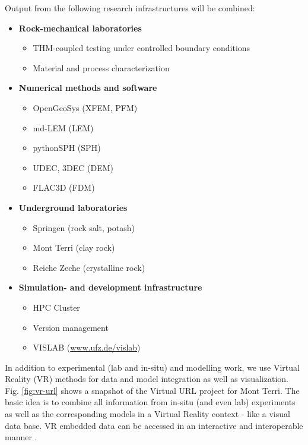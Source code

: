 Output from the following research infrastructures will be combined:
\begin{itemize}
    \item \textbf{Rock-mechanical laboratories}
	\begin{itemize}
		\item THM-coupled testing under controlled boundary conditions
		\item Material and process characterization
	\end{itemize}
	\item \textbf{Numerical methods and software}
	\begin{itemize}
		\item OpenGeoSys (XFEM, PFM)
		\item md-LEM (LEM)
		\item pythonSPH (SPH)
		\item UDEC, 3DEC (DEM)
		\item FLAC3D (FDM)
	\end{itemize}
	\item \textbf{Underground laboratories}
	\begin{itemize}
		\item Springen (rock salt, potash)
		\item Mont Terri (clay rock)
		\item Reiche Zeche (crystalline rock)
	\end{itemize}
	\item \textbf{Simulation- and development infrastructure}
	\begin{itemize}
		\item HPC Cluster
		\item Version management
		\item VISLAB (\url{www.ufz.de/vislab})
	\end{itemize}
\end{itemize}

In addition to experimental (lab and in-situ) and modelling work, we use Virtual Reality (VR) methods for data and model integration as well as visualization. Fig. \ref{fig:vr-url} shows a snapshot of the Virtual URL project for Mont Terri. The basic idea is to combine all information from in-situ (and even lab) experiments as well as the corresponding models in a Virtual Reality context - like a visual data base. VR embedded data can be accessed in an interactive and interoperable manner \cite{Rink2020}.

